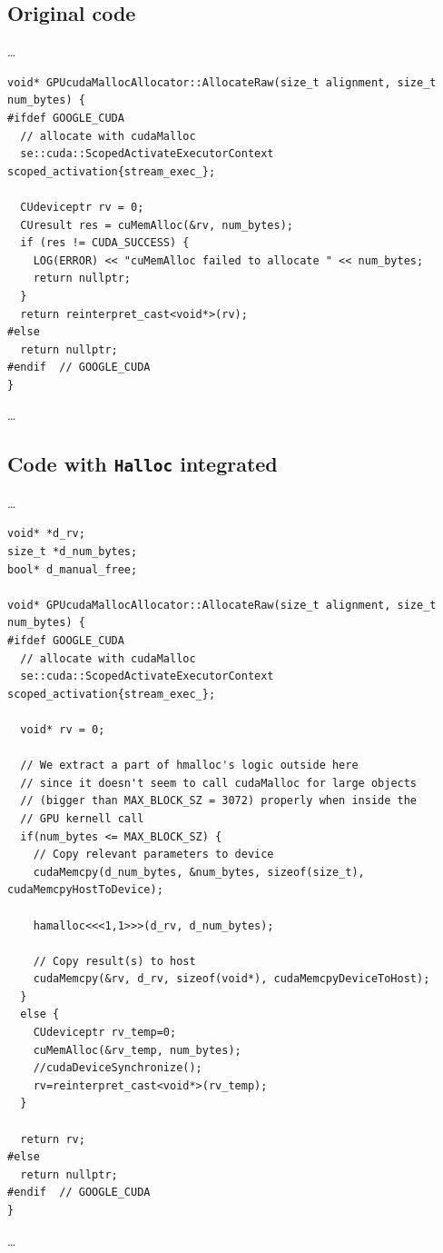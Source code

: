 \documentclass[12pt,twoside]{article}
\begin{document}
\subsection{Original code}
\label{app:gpu-cudamalloc-original}
\ldots
\begin{verbatim}
void* GPUcudaMallocAllocator::AllocateRaw(size_t alignment, size_t num_bytes) {
#ifdef GOOGLE_CUDA
  // allocate with cudaMalloc
  se::cuda::ScopedActivateExecutorContext scoped_activation{stream_exec_};

  CUdeviceptr rv = 0;
  CUresult res = cuMemAlloc(&rv, num_bytes);
  if (res != CUDA_SUCCESS) {
    LOG(ERROR) << "cuMemAlloc failed to allocate " << num_bytes;
    return nullptr;
  }
  return reinterpret_cast<void*>(rv);
#else
  return nullptr;
#endif  // GOOGLE_CUDA
}
\end{verbatim}
\ldots

\subsection{Code with \texttt{Halloc} integrated}
\label{app:gpu-cudamalloc-halloc}
\ldots
\begin{verbatim}
void* *d_rv;
size_t *d_num_bytes;
bool* d_manual_free;

void* GPUcudaMallocAllocator::AllocateRaw(size_t alignment, size_t num_bytes) {
#ifdef GOOGLE_CUDA
  // allocate with cudaMalloc
  se::cuda::ScopedActivateExecutorContext scoped_activation{stream_exec_};

  void* rv = 0;

  // We extract a part of hmalloc's logic outside here
  // since it doesn't seem to call cudaMalloc for large objects
  // (bigger than MAX_BLOCK_SZ = 3072) properly when inside the
  // GPU kernell call
  if(num_bytes <= MAX_BLOCK_SZ) {
    // Copy relevant parameters to device
    cudaMemcpy(d_num_bytes, &num_bytes, sizeof(size_t), cudaMemcpyHostToDevice);

    hamalloc<<<1,1>>>(d_rv, d_num_bytes);

    // Copy result(s) to host
    cudaMemcpy(&rv, d_rv, sizeof(void*), cudaMemcpyDeviceToHost);
  }
  else {
    CUdeviceptr rv_temp=0;
    cuMemAlloc(&rv_temp, num_bytes);
    //cudaDeviceSynchronize();
    rv=reinterpret_cast<void*>(rv_temp);
  }

  return rv;
#else
  return nullptr;
#endif  // GOOGLE_CUDA
}
\end{verbatim}
\ldots
\end{document}
